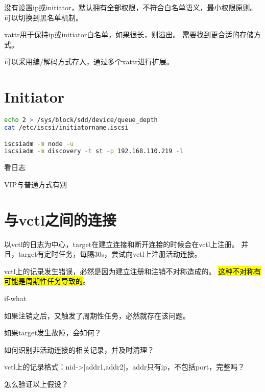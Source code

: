没有设置ip或initiator，默认拥有全部权限，不符合白名单语义，最小权限原则。
可以切换到黑名单机制。

xattr用于保持ip或initiator白名单，如果很长，则溢出。
需要找到更合适的存储方式。

可以采用编/解码方式存入，通过多个xattr进行扩展。

\section{Initiator}

\begin{lstlisting}[language=bash,frame=single]
echo 2 > /sys/block/sdd/device/queue_depth
cat /etc/iscsi/initiatorname.iscsi

iscsiadm -m node -u
iscsiadm -m discovery -t st -p 192.168.110.219 -l
\end{lstlisting}

看日志

VIP与普通方式有别

\section{与vctl之间的连接}

以vctl的日志为中心，target在建立连接和断开连接的时候会在vctl上注册。
并且，target有定时任务，每隔30s，尝试向vctl上注册活动连接。

vctl上的记录发生错误，必然是因为建立注册和注销不对称造成的。
\hl{这种不对称有可能是周期性任务导致的}。

if-what
\begin{enumbox}
\item 如果注销之后，又触发了周期性任务，必然就存在该问题。
\item 如果target发生故障，会如何？
\end{enumbox}

如何识别非活动连接的相关记录，并及时清理？

vctl上的记录格式：nid->[addr1,addr2]，addr只有ip，不包括port，完整吗？

怎么验证以上假设？
